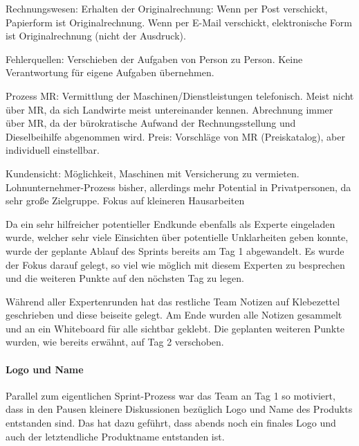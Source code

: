 Rechnungswesen: 
Erhalten der Originalrechnung: Wenn per Post verschickt, Papierform ist Originalrechnung. Wenn per E-Mail verschickt, elektronische Form ist Originalrechnung (nicht der Ausdruck). 

Fehlerquellen:
Verschieben der Aufgaben von Person zu Person. Keine Verantwortung für eigene Aufgaben übernehmen.

Prozess MR:
Vermittlung der Maschinen/Dienstleistungen telefonisch. Meist nicht über MR, da sich Landwirte meist untereinander kennen. Abrechnung immer über MR, da der bürokratische Aufwand der Rechnungsstellung und Dieselbeihilfe abgenommen wird. Preis: Vorschläge von MR (Preiskatalog), aber individuell einstellbar.

Kundensicht: Möglichkeit, Maschinen mit Versicherung zu vermieten. Lohnunternehmer-Prozess bisher, allerdings mehr Potential in Privatpersonen, da sehr große Zielgruppe. Fokus auf kleineren Hausarbeiten

Da ein sehr hilfreicher potentieller Endkunde ebenfalls als Experte eingeladen wurde, welcher sehr viele Einsichten über potentielle Unklarheiten geben konnte, wurde der geplante Ablauf des Sprints bereits am Tag 1 abgewandelt. Es wurde der Fokus darauf gelegt, so viel wie möglich mit diesem Experten zu besprechen und die weiteren Punkte auf den nöchsten Tag zu legen.

Während aller Expertenrunden hat das restliche Team Notizen auf Klebezettel geschrieben und diese beiseite gelegt. Am Ende wurden alle Notizen gesammelt und an ein Whiteboard für alle sichtbar geklebt. Die geplanten weiteren Punkte wurden, wie bereits erwähnt, auf Tag 2 verschoben.

\paragraph{Logo und Name}
Parallel zum eigentlichen Sprint-Prozess war das Team an Tag 1 so motiviert, dass in den Pausen kleinere Diskussionen bezüglich Logo und Name des Produkts entstanden sind. Das hat dazu geführt, dass abends noch ein finales Logo und auch der letztendliche Produktname entstanden ist. 


